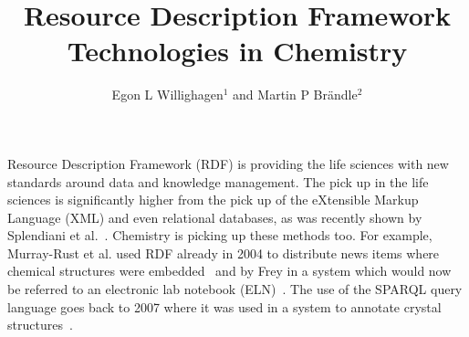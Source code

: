 \documentclass[10pt]{bmc_article}
\newenvironment{bmcformat}{\begin{raggedright}\baselineskip20pt\sloppy\setboolean{publ}{false}}{\end{raggedright}\baselineskip20pt\sloppy}
\begin{document}
\begin{bmcformat}

\title{Resource Description Framework Technologies in Chemistry}
 
\author{Egon L Willighagen\correspondingauthor$^{1}$%
       and 
         Martin P Br\"andle$^2$%
      }

\address{%
    \iid(1)Division of Molecular Toxicology, Institute of Environmental Medicine, Karolinska Institutet, SE-17177 Stockholm, Sweden\\
    \iid(2)Chemistry Biology Pharmacy Information Center, ETH Z\"urich, Wolfgang-Pauli-Str. 10, 8093 Z\"urich, Switzerland
}%

\maketitle




Resource Description Framework (RDF) is providing the life sciences with new standards
around data and knowledge management. The pick up in the life sciences is
significantly higher from the pick up of the eXtensible Markup Language (XML)
and even relational databases, as was recently shown by Splendiani et
al.~\cite{Splendiani2011}. Chemistry is picking up these methods too.
For example, Murray-Rust et al. used RDF already in 2004 to distribute
news items where chemical structures were embedded~\cite{MurrayRust2004}
and by Frey in a system which would now be referred to an
electronic lab notebook (ELN)~\cite{Frey2004}. The use of the SPARQL
query language goes back to 2007 where it was used in a system to annotate
crystal structures~\cite{Hunter2007}.


\end{bmcformat}
\end{document}
